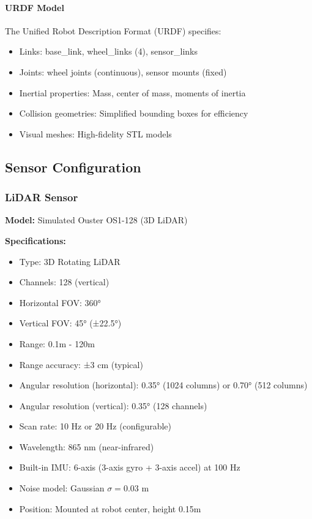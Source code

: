 \paragraph{URDF Model}
The Unified Robot Description Format (URDF) specifies:
\begin{itemize}
    \item Links: base\_link, wheel\_links (4), sensor\_links
    \item Joints: wheel joints (continuous), sensor mounts (fixed)
    \item Inertial properties: Mass, center of mass, moments of inertia
    \item Collision geometries: Simplified bounding boxes for efficiency
    \item Visual meshes: High-fidelity STL models
\end{itemize}

\subsection{Sensor Configuration}

\subsubsection{LiDAR Sensor}

\textbf{Model:} Simulated Ouster OS1-128 (3D LiDAR)

\textbf{Specifications:}
\begin{itemize}
    \item Type: 3D Rotating LiDAR
    \item Channels: 128 (vertical)
    \item Horizontal FOV: 360°
    \item Vertical FOV: 45° (±22.5°)
    \item Range: 0.1m - 120m
    \item Range accuracy: ±3 cm (typical)
    \item Angular resolution (horizontal): 0.35° (1024 columns) or 0.70° (512 columns)
    \item Angular resolution (vertical): 0.35° (128 channels)
    \item Scan rate: 10 Hz or 20 Hz (configurable)
    \item Wavelength: 865 nm (near-infrared)
    \item Built-in IMU: 6-axis (3-axis gyro + 3-axis accel) at 100 Hz
    \item Noise model: Gaussian $\sigma = 0.03$ m
    \item Position: Mounted at robot center, height 0.15m
\end{itemize}

